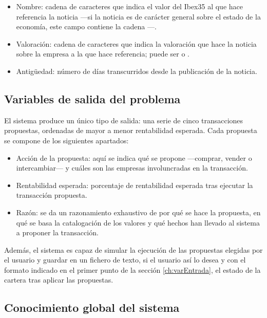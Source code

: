 \documentclass[a4paper, 11pt, titlepage]{article}
\begin{document}
\begin{enumerate}
        \begin{itemize}
            \item Nombre: cadena de caracteres que indica el valor del Ibex35 al que hace referencia la noticia ---si la noticia es de carácter general sobre el estado de la economía, este campo contiene la cadena ---.
            \item Valoración: cadena de caracteres que indica la valoración que hace la noticia sobre la empresa a la que hace referencia; puede ser  o .
            \item Antigüedad: número de días transcurridos desde la publicación de la noticia.
        \end{itemize}
    \end{enumerate}

    \subsection{Variables de salida del problema}
    \label{ch:defPropuestas}

    El sistema produce un único tipo de salida: una serie de cinco transacciones propuestas, ordenadas de mayor a menor rentabilidad esperada. Cada propuesta se compone de los siguientes apartados:
    \begin{itemize}
        \item Acción de la propuesta: aquí se indica qué se propone ---comprar, vender o intercambiar--- y cuáles son las empresas involuncradas en la transacción.
        \item Rentabilidad esperada: porcentaje de rentabilidad esperada tras ejecutar la transacción propuesta.
        \item Razón: se da un razonamiento exhaustivo de por qué se hace la propuesta, en qué se basa la catalogación de los valores y qué hechos han llevado al sistema a proponer la transacción.
    \end{itemize}

    Además, el sistema es capaz de simular la ejecución de las propuestas elegidas por el usuario y guardar en un fichero de texto, si el usuario así lo desea y con el formato indicado en el primer punto de la sección \ref{ch:varEntrada}, el estado de la cartera tras aplicar las propuestas.

    \subsection{Conocimiento global del sistema}
\end{document}
